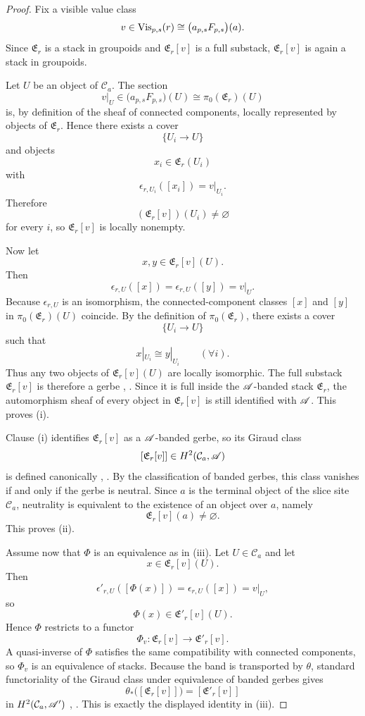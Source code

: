 \begin{proof}
Fix a visible value class
\[
v\in \mathrm{Vis}_{p,s}(r)\cong \bigl(a_{p,s}F_{p,s}\bigr)(a).
\]
Since $\mathfrak E_r$ is a stack in groupoids and $\mathfrak E_r[v]$ is a full substack, $\mathfrak E_r[v]$ is again a stack in groupoids.

Let $U$ be an object of $\mathcal C_a$. The section
\[
v|_U\in \bigl(a_{p,s}F_{p,s}\bigr)(U)\cong \pi_0(\mathfrak E_r)(U)
\]
is, by definition of the sheaf of connected components, locally represented by objects of $\mathfrak E_r$. Hence there exists a cover
\[
\{U_i\to U\}
\]
and objects
\[
x_i\in \mathfrak E_r(U_i)
\]
with
\[
\epsilon_{r,U_i}([x_i])=v|_{U_i}.
\]
Therefore
\[
(\mathfrak E_r[v])(U_i)\neq\varnothing
\]
for every $i$, so $\mathfrak E_r[v]$ is locally nonempty.

Now let
\[
x,y\in \mathfrak E_r[v](U).
\]
Then
\[
\epsilon_{r,U}([x])=\epsilon_{r,U}([y])=v|_U.
\]
Because $\epsilon_{r,U}$ is an isomorphism, the connected-component classes $[x]$ and $[y]$ in $\pi_0(\mathfrak E_r)(U)$ coincide. By the definition of $\pi_0(\mathfrak E_r)$, there exists a cover
\[
\{U_i\to U\}
\]
such that
\[
x|_{U_i}\cong y|_{U_i}
\qquad
(\forall i).
\]
Thus any two objects of $\mathfrak E_r[v](U)$ are locally isomorphic. The full substack $\mathfrak E_r[v]$ is therefore a gerbe \cite[Chap.~IV]{Giraud1971}, \cite[Tag 06NY]{StacksProject}. Since it is full inside the $\mathscr{A}$-banded stack $\mathfrak E_r$, the automorphism sheaf of every object in $\mathfrak E_r[v]$ is still identified with $\mathscr{A}$. This proves \textup{(i)}.

Clause \textup{(i)} identifies $\mathfrak E_r[v]$ as a $\mathscr{A}$-banded gerbe, so its Giraud class
\[
[\mathfrak E_r[v]]\in H^2(\mathcal C_a,\mathscr{A})
\]
is defined canonically \cite[Chap.~IV]{Giraud1971}, \cite[Tag 06NY]{StacksProject}. By the classification of banded gerbes, this class vanishes if and only if the gerbe is neutral. Since $a$ is the terminal object of the slice site $\mathcal C_a$, neutrality is equivalent to the existence of an object over $a$, namely
\[
\mathfrak E_r[v](a)\neq\varnothing.
\]
This proves \textup{(ii)}.

Assume now that $\Phi$ is an equivalence as in \textup{(iii)}. Let $U\in\mathcal C_a$ and let
\[
x\in \mathfrak E_r[v](U).
\]
Then
\[
\epsilon'_{r,U}([\Phi(x)])
=
\epsilon_{r,U}([x])
=
v|_U,
\]
so
\[
\Phi(x)\in \mathfrak E'_r[v](U).
\]
Hence $\Phi$ restricts to a functor
\[
\Phi_v:\mathfrak E_r[v]\to \mathfrak E'_r[v].
\]
A quasi-inverse of $\Phi$ satisfies the same compatibility with connected components, so $\Phi_v$ is an equivalence of stacks. Because the band is transported by $\theta$, standard functoriality of the Giraud class under equivalence of banded gerbes gives
\[
\theta_*\bigl([\mathfrak E_r[v]]\bigr)=[\mathfrak E'_r[v]]
\]
in $H^2(\mathcal C_a,\mathscr{A}')$ \cite[Chap.~IV]{Giraud1971}, \cite[Tag 06NY]{StacksProject}. This is exactly the displayed identity in \textup{(iii)}.


\end{proof}
